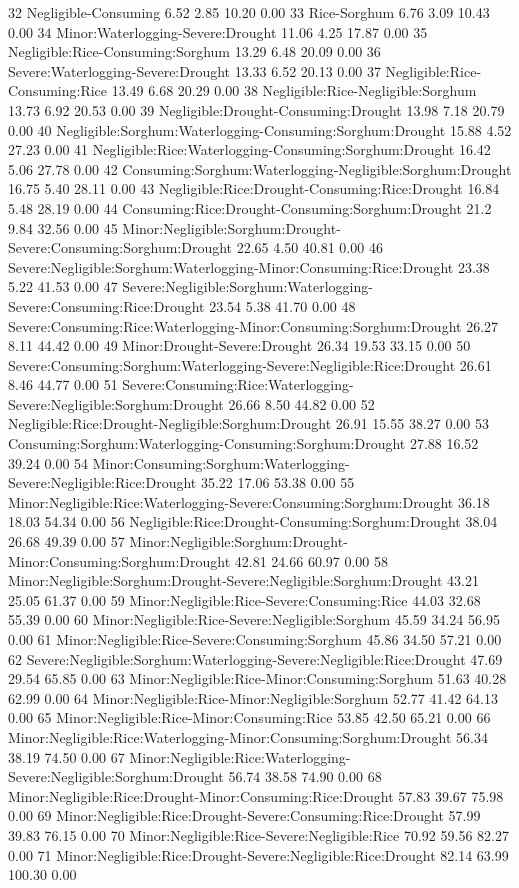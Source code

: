 \documentclass[12pt,oneside]{article}
\begin{document}
32 Negligible-Consuming 6.52 2.85 10.20 0.00
33 Rice-Sorghum 6.76 3.09 10.43 0.00
34 Minor:Waterlogging-Severe:Drought 11.06 4.25 17.87 0.00
35 Negligible:Rice-Consuming:Sorghum 13.29 6.48 20.09 0.00
36 Severe:Waterlogging-Severe:Drought 13.33 6.52 20.13 0.00
37 Negligible:Rice-Consuming:Rice 13.49 6.68 20.29 0.00
38 Negligible:Rice-Negligible:Sorghum 13.73 6.92 20.53 0.00
39 Negligible:Drought-Consuming:Drought 13.98 7.18 20.79 0.00
40 Negligible:Sorghum:Waterlogging-Consuming:Sorghum:Drought 15.88 4.52 27.23 0.00
41 Negligible:Rice:Waterlogging-Consuming:Sorghum:Drought 16.42 5.06 27.78 0.00
42 Consuming:Sorghum:Waterlogging-Negligible:Sorghum:Drought 16.75 5.40 28.11 0.00
43 Negligible:Rice:Drought-Consuming:Rice:Drought 16.84 5.48 28.19 0.00
44 Consuming:Rice:Drought-Consuming:Sorghum:Drought 21.2 9.84 32.56 0.00
45 Minor:Negligible:Sorghum:Drought-Severe:Consuming:Sorghum:Drought 22.65 4.50 40.81 0.00
46 Severe:Negligible:Sorghum:Waterlogging-Minor:Consuming:Rice:Drought 23.38 5.22 41.53 0.00
47 Severe:Negligible:Sorghum:Waterlogging-Severe:Consuming:Rice:Drought 23.54 5.38 41.70 0.00
48 Severe:Consuming:Rice:Waterlogging-Minor:Consuming:Sorghum:Drought 26.27 8.11 44.42 0.00
49 Minor:Drought-Severe:Drought 26.34 19.53 33.15 0.00
50 Severe:Consuming:Sorghum:Waterlogging-Severe:Negligible:Rice:Drought 26.61 8.46 44.77 0.00
51 Severe:Consuming:Rice:Waterlogging-Severe:Negligible:Sorghum:Drought 26.66 8.50 44.82 0.00
52 Negligible:Rice:Drought-Negligible:Sorghum:Drought 26.91 15.55 38.27 0.00
53 Consuming:Sorghum:Waterlogging-Consuming:Sorghum:Drought 27.88 16.52 39.24 0.00
54 Minor:Consuming:Sorghum:Waterlogging-Severe:Negligible:Rice:Drought 35.22 17.06 53.38 0.00
55 Minor:Negligible:Rice:Waterlogging-Severe:Consuming:Sorghum:Drought 36.18 18.03 54.34 0.00
56 Negligible:Rice:Drought-Consuming:Sorghum:Drought 38.04 26.68 49.39 0.00
57 Minor:Negligible:Sorghum:Drought-Minor:Consuming:Sorghum:Drought 42.81 24.66 60.97 0.00
58 Minor:Negligible:Sorghum:Drought-Severe:Negligible:Sorghum:Drought 43.21 25.05 61.37 0.00
59 Minor:Negligible:Rice-Severe:Consuming:Rice 44.03 32.68 55.39 0.00
60 Minor:Negligible:Rice-Severe:Negligible:Sorghum 45.59 34.24 56.95 0.00
61 Minor:Negligible:Rice-Severe:Consuming:Sorghum 45.86 34.50 57.21 0.00
62 Severe:Negligible:Sorghum:Waterlogging-Severe:Negligible:Rice:Drought 47.69 29.54 65.85 0.00
63 Minor:Negligible:Rice-Minor:Consuming:Sorghum 51.63 40.28 62.99 0.00
64 Minor:Negligible:Rice-Minor:Negligible:Sorghum 52.77 41.42 64.13 0.00
65 Minor:Negligible:Rice-Minor:Consuming:Rice 53.85 42.50 65.21 0.00
66 Minor:Negligible:Rice:Waterlogging-Minor:Consuming:Sorghum:Drought 56.34 38.19 74.50 0.00
67 Minor:Negligible:Rice:Waterlogging-Severe:Negligible:Sorghum:Drought 56.74 38.58 74.90 0.00
68 Minor:Negligible:Rice:Drought-Minor:Consuming:Rice:Drought 57.83 39.67 75.98 0.00
69 Minor:Negligible:Rice:Drought-Severe:Consuming:Rice:Drought 57.99 39.83 76.15 0.00
70 Minor:Negligible:Rice-Severe:Negligible:Rice 70.92 59.56 82.27 0.00
71 Minor:Negligible:Rice:Drought-Severe:Negligible:Rice:Drought 82.14 63.99 100.30 0.00
\end{document}

